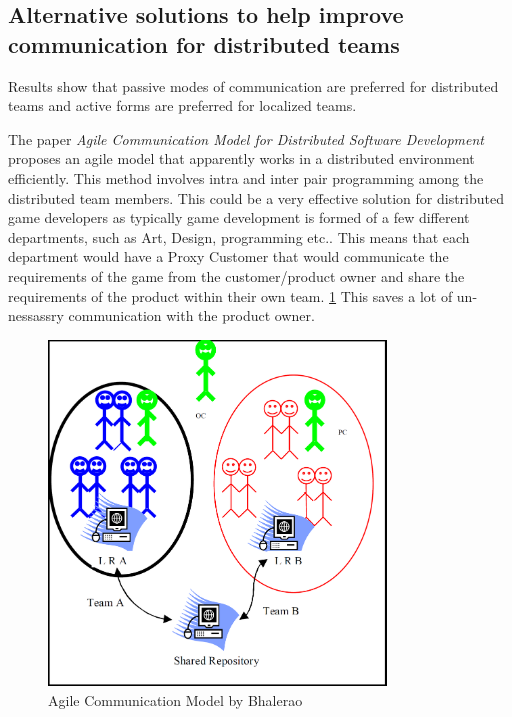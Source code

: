 \documentclass{scrartcl}
\begin{document}
\subsection{Alternative solutions to help improve communication for distributed teams}

Results show that passive modes of communication are preferred for distributed teams and active forms are preferred for localized teams. \cite{joshi2013}

The paper \textit{Agile Communication Model for Distributed Software Development} \cite{bhalerao2010} proposes an agile model that apparently works in a distributed environment efficiently. This method involves intra and inter pair programming among the distributed team members. 
This could be a very effective solution for distributed game developers as typically game development is formed of a few different departments, such as Art, Design, programming etc.. This means that each department would have a Proxy Customer that would communicate the requirements of the game from the customer/product owner and share the requirements of the product within their own team. \ref{fig:ACM} This saves a lot of un-nessassry communication with the product owner.

\begin{figure}[p]
    \centering
    \includegraphics[width=0.8\textwidth]{ACMDSD}
    \caption{Agile Communication Model by Bhalerao\cite{bhalerao2010}}
    \label{fig:ACM}
\end{figure}
\end{document}
